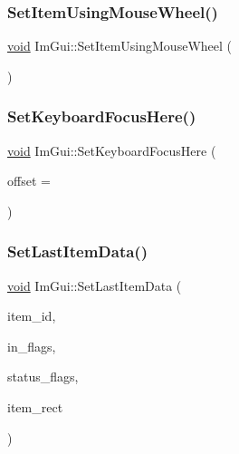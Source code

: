 \subsubsection{\texorpdfstring{Set\+Item\+Using\+Mouse\+Wheel()}{SetItemUsingMouseWheel()}}
{\footnotesize\ttfamily \hyperlink{imgui__impl__opengl3__loader_8h_ac668e7cffd9e2e9cfee428b9b2f34fa7}{void} Im\+Gui\+::\+Set\+Item\+Using\+Mouse\+Wheel (\begin{DoxyParamCaption}{ }\end{DoxyParamCaption})}

\mbox{\label{namespaceImGui_ae85e5fba7e88cea8bd3ba5b687c979f2}} 
\subsubsection{\texorpdfstring{Set\+Keyboard\+Focus\+Here()}{SetKeyboardFocusHere()}}
{\footnotesize\ttfamily \hyperlink{imgui__impl__opengl3__loader_8h_ac668e7cffd9e2e9cfee428b9b2f34fa7}{void} Im\+Gui\+::\+Set\+Keyboard\+Focus\+Here (\begin{DoxyParamCaption}\item[{int}]{offset = {} }\end{DoxyParamCaption})}

\mbox{\label{namespaceImGui_a06a6c26188e778755bb9aa83f2726533}} 
\subsubsection{\texorpdfstring{Set\+Last\+Item\+Data()}{SetLastItemData()}}
{\footnotesize\ttfamily \hyperlink{imgui__impl__opengl3__loader_8h_ac668e7cffd9e2e9cfee428b9b2f34fa7}{void} Im\+Gui\+::\+Set\+Last\+Item\+Data (\begin{DoxyParamCaption}\item[{Im\+Gui\+ID}]{item\+\_\+id,  }\item[{\hyperlink{imgui__internal_8h_abcf9eafab4557e911b2c0d8fe2feeb38}{Im\+Gui\+Item\+Flags}}]{in\+\_\+flags,  }\item[{\hyperlink{imgui__internal_8h_a86b8f9e2fd4084fb2112f003070b53fa}{Im\+Gui\+Item\+Status\+Flags}}]{status\+\_\+flags,  }\item[{const \hyperlink{structImRect}{Im\+Rect} \&}]{item\+\_\+rect }\end{DoxyParamCaption})}

